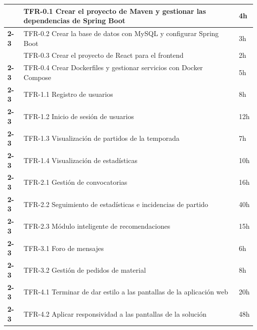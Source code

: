 \begin{longtable}{|>{\bfseries}p{3.5cm}|p{7cm}|p{2cm}|}
  \multirow{2}{*}{Realización}
                & TFR-0.1 Crear el proyecto de Maven y gestionar las dependencias de Spring Boot & 4h                  \\
  \cline{2-3}
                & TFR-0.2 Crear la base de datos con MySQL y configurar Spring Boot              & 3h                  \\
  \hline
                & TFR-0.3 Crear el proyecto de React para el frontend                            & 2h                  \\
  \cline{2-3}
                & TFR-0.4 Crear Dockerfiles y gestionar servicios con Docker Compose             & 5h                  \\
  \cline{2-3}
                & TFR-1.1 Registro de usuarios                                                   & 8h                  \\
  \cline{2-3}
                & TFR-1.2 Inicio de sesión de usuarios                                           & 12h                 \\
  \cline{2-3}
                & TFR-1.3 Visualización de partidos de la temporada                              & 7h                  \\
  \cline{2-3}
                & TFR-1.4 Visualización de estadísticas                                          & 10h                 \\
  \cline{2-3}
                & TFR-2.1 Gestión de convocatorias                                               & 16h                 \\
  \cline{2-3}
                & TFR-2.2 Seguimiento de estadísticas e incidencias de partido                   & 40h                 \\
  \cline{2-3}
                & TFR-2.3 Módulo inteligente de recomendaciones                                  & 15h                 \\
  \cline{2-3}
                & TFR-3.1 Foro de mensajes                                                       & 6h                  \\
  \cline{2-3}
                & TFR-3.2 Gestión de pedidos de material                                         & 8h                  \\
  \cline{2-3}
                & TFR-4.1 Terminar de dar estilo a las pantallas de la aplicación web            & 20h                 \\
  \cline{2-3}
                & TFR-4.2 Aplicar responsividad a las pantallas de la solución                   & 48h                 \\
  \hline


\end{longtable}
